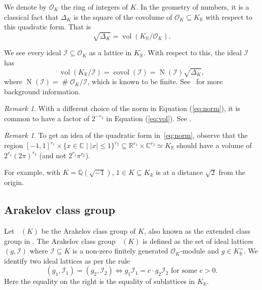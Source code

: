 \documentclass[a4paper]{article}
\theoremstyle{definition}
\theoremstyle{remark}
\newtheorem{remark}[theorem]{Remark}
\DeclareMathOperator{\vol}{vol}
\DeclareMathOperator{\covol}{covol}
\DeclareMathOperator{\card}{\#}
\DeclareMathOperator{\N}{N}
\DeclareMathOperator{\Ar}{\widetilde{Cl}}
\newcommand{\OK}{\mathcal{O}_K}
\newcommand{\KR}{K_{\mathbb{R}}}
\begin{document}
 We denote by $\OK$ the ring of integers of $K$.  In the geometry of numbers, it is a classical fact that $\Delta_K$ is the square of the covolume of $\OK \subseteq \KR$ with respect to this quadratic form. That is
\begin{equation}
	\sqrt{\Delta_{K} } = \vol( \KR/\OK ).
\end{equation}


We see every ideal $\mathcal{I} \subseteq \OK$ as a lattice in $\KR$. With respect to this, the ideal $\mathcal{I}$ has 
\begin{equation}
\vol(\KR/\mathcal{I}) = \covol(\mathcal{I}) = \N(\mathcal{I}) \sqrt{\Delta_K},
\label{eq:vol}
\end{equation}
where $\N(\mathcal{I}) = \card \OK/\mathcal{I}$, which is known to be finite. 
See~\cite{Neu13} for more background information.

\begin{remark}
With a different choice of the norm in Equation (\ref{eq:norm}), it is common to have a factor of $2^{-r_2}$ in Equation (\ref{eq:vol}). See \cite[Chapter I-\S 5]{Neu13}.
\end{remark}

\begin{remark}
\label{re:peculiar_norm}
To get an idea of the quadratic form in~\cref{eq:norm}, observe that 
the region $[-1,1]^{r_1} \times \{x \in \mathbb{C} \mid |x| \leq 1\}^{r_2} \subseteq \mathbb{R}^{r_1} \times \mathbb{C}^{r_2}\simeq \KR$  should have a volume of $2^{r_1} (2 \pi)^{r_2}$ (and not $2^{r_1} \pi^{r_2}$).

For example, with $K =\mathbb{Q}( \sqrt{-1})$, $1 \in K \subseteq K_{\mathbb{R}}$ is at a distance $\sqrt{2}$ from the origin.
\end{remark}

\subsection{Arakelov class group}
\label{se:arakelov}

Let $\Ar(K)$ be the Arakelov class group of $K$, also known as the extended class group in \cite{MV07}. 
The Arakelov class group $\Ar(K)$ 
is defined as the set of ideal lattices $(g, \mathcal{I})$ where $\mathcal{I}\subseteq K$ is a non-zero finitely generated $\OK$-module
and $g \in K_\mathbb{R}^{\times}$. We identify two ideal lattices as per the rule
\begin{equation}
	(g_1, \mathcal{I}_1) = (g_2,\mathcal{I}_2) \Leftrightarrow g_1 \mathcal{I}_1  = c\cdot g_2 \mathcal{I}_2 \text{ for some }c>0.
\end{equation}
Here the equality on the right is the equality of sublattices in $\KR$. 
\end{document}
